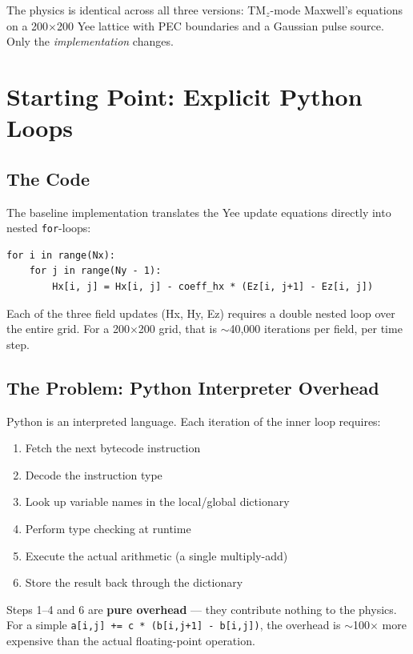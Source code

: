 \documentclass[11pt,a4paper]{article}
\begin{document}
The physics is identical across all three versions: TM$_z$-mode Maxwell's equations on a 200$\times$200 Yee lattice with PEC boundaries and a Gaussian pulse source. Only the \emph{implementation} changes.


\section{Starting Point: Explicit Python Loops}

\subsection{The Code}

The baseline implementation translates the Yee update equations directly into nested \texttt{for}-loops:

\begin{lstlisting}[caption={H-field update --- explicit loops}]
for i in range(Nx):
    for j in range(Ny - 1):
        Hx[i, j] = Hx[i, j] - coeff_hx * (Ez[i, j+1] - Ez[i, j])
\end{lstlisting}

Each of the three field updates (Hx, Hy, Ez) requires a double nested loop over the entire grid. For a 200$\times$200 grid, that is $\sim$40,000 iterations per field, per time step.

\subsection{The Problem: Python Interpreter Overhead}

\begin{tcolorbox}[colback=red!3, colframe=warnred, title=\textbf{Bottleneck \#1: Python bytecode dispatch}]
Python is an interpreted language. Each iteration of the inner loop requires:
\begin{enumerate}[nosep]
    \item Fetch the next bytecode instruction
    \item Decode the instruction type
    \item Look up variable names in the local/global dictionary
    \item Perform type checking at runtime
    \item Execute the actual arithmetic (a single multiply-add)
    \item Store the result back through the dictionary
\end{enumerate}
Steps 1--4 and 6 are \textbf{pure overhead} --- they contribute nothing to the physics. For a simple \texttt{a[i,j] += c * (b[i,j+1] - b[i,j])}, the overhead is $\sim$100$\times$ more expensive than the actual floating-point operation.
\end{tcolorbox}
\end{document}
